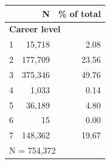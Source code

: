 \begin{tabular}{lrr}


\toprule


 & N & \% of total \\


\midrule


\multicolumn{3}{l}{\textbf{Career level}}\\ 
\midrule
1                   &      15,718&        2.08\\
2                   &     177,709&       23.56\\
3                   &     375,346&       49.76\\
4                   &       1,033&        0.14\\
5                   &      36,189&        4.80\\
6                   &          15&        0.00\\
7                   &     148,362&       19.67\\
\midrule


\multicolumn{3}{l}{\footnotesize N =      754,372}\\


\bottomrule


\end{tabular}


